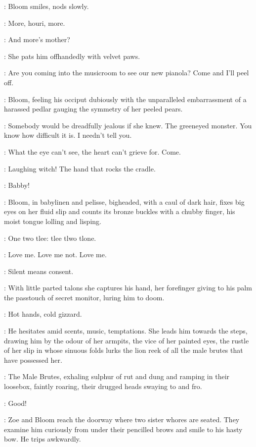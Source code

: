 :
Bloom smiles, nods slowly.

\Bloom:
More, houri, more.

\Zoe:
And more's mother?

:
She pats him offhandedly with velvet paws.

\Zoe:
Are you coming into the musicroom to see our new pianola?
Come and I'll peel off.

:
Bloom, feeling his occiput dubiously with the unparalleled embarrassment
of a harassed pedlar gauging the symmetry of her peeled pears.

\Bloom:
Somebody would be dreadfully jealous if she knew.
The greeneyed monster.
You know how difficult it is.
I needn't tell you.

\Zoe:
What the eye can't see, the heart can't grieve for.
Come.

\Bloom:
Laughing witch!
The hand that rocks the cradle.

\Zoe:
Babby!

:
Bloom, in babylinen and pelisse,
bigheaded, with a caul of dark hair,
fixes big eyes on her fluid slip
and counts its bronze buckles with a chubby finger,
his moist tongue lolling and lisping.

\Bloom:
One two tlee:
tlee tlwo tlone.

\Buckles[2]:
Love me.
Love me not.
Love me.

\Zoe:
Silent means consent.

:
With little parted talons she captures his hand,
her forefinger giving to his palm the passtouch of secret monitor,
luring him to doom.

\Zoe:
Hot hands, cold gizzard.

:
He hesitates amid scents, music, temptations.
She leads him towards the steps,
drawing him by the odour of her armpits,
the vice of her painted eyes,
the rustle of her slip in whose sinuous folds
lurks the lion reek of all the male brutes that have possessed her.

:
The Male Brutes, exhaling sulphur of rut and dung
and ramping in their loosebox, faintly roaring,
their drugged heads swaying to and fro.

\MaleBrutes:
Good!

:
Zoe and Bloom reach the doorway where two sister whores are seated.
They examine him curiously from under their pencilled brows and smile to his hasty bow.
He trips awkwardly.


